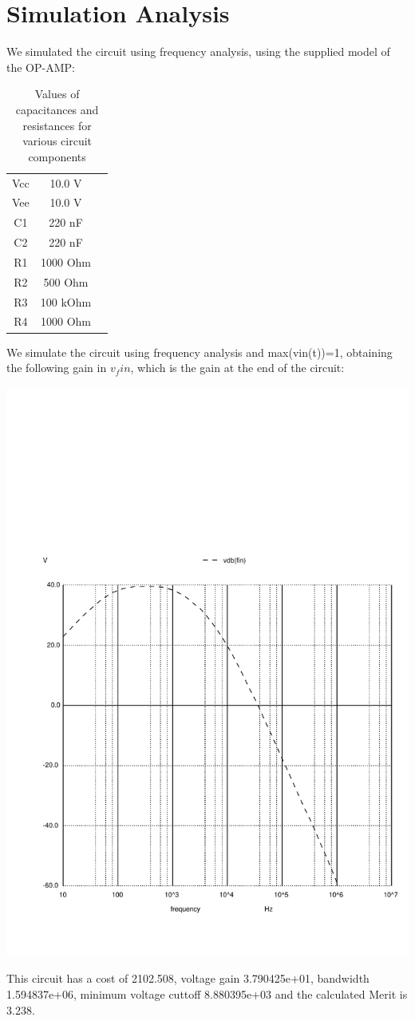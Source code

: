 \section{Simulation Analysis}
\label{sec:simulation}

We simulated the circuit using frequency analysis, using the supplied model of the OP-AMP:

\begin{table}[H]
\addtolength{\tabcolsep}{-4pt}
\caption{Values of capacitances and resistances for various circuit components}
\vspace{-3mm}
\begin{tabular}{|c|c|c|}
\hline
Vcc & 10.0 V\\
Vee & 10.0 V\\
C1 & 220 nF\\
C2 & 220 nF\\
R1 & 1000 Ohm\\
R2 & 500 Ohm\\
R3 & 100 kOhm\\
R4 & 1000 Ohm\\
\hline
\end{tabular}
\label{tab:Components}
\end{table}

\par

We simulate the circuit using frequency analysis and max(vin(t))=1, obtaining the following gain in $v_fin$, which is the gain at the end of the circuit:

\includegraphics[width=0.8\linewidth]{../sim/vo1f.pdf}

\par


This circuit has a cost of 2102.508, voltage gain 3.790425e+01, bandwidth 1.594837e+06, minimum voltage cuttoff 8.880395e+03 and the  calculated Merit is 3.238.
